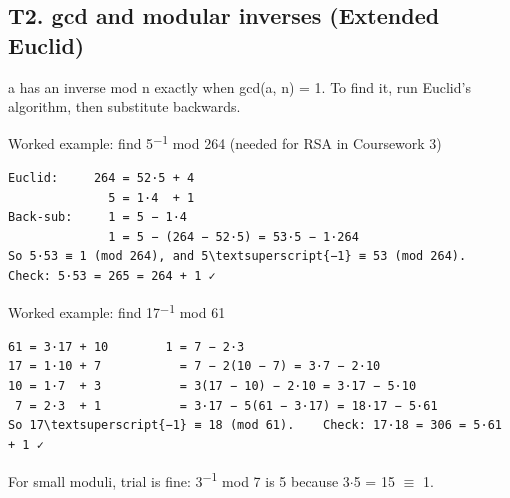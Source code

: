 \documentclass[11pt,a4paper]{article}
\begin{document}
\subsection*{T2. gcd and modular inverses (Extended Euclid)}
a has an inverse mod n exactly when gcd(a, n) = 1. To find it, run Euclid's algorithm, then substitute backwards.\par
\begin{example}{Worked example: find 5\textsuperscript{\ensuremath{-}1} mod 264 (needed for RSA in Coursework 3)}
\begin{workbox}
\begin{Verbatim}[commandchars=\\\{\},fontsize=\footnotesize]
Euclid:     264 = 52·5 + 4
              5 = 1·4  + 1
Back-sub:     1 = 5 − 1·4
              1 = 5 − (264 − 52·5) = 53·5 − 1·264
So 5·53 ≡ 1 (mod 264), and 5\textsuperscript{−1} ≡ 53 (mod 264).    Check: 5·53 = 265 = 264 + 1 ✓
\end{Verbatim}
\end{workbox}
\end{example}
\begin{example}{Worked example: find 17\textsuperscript{\ensuremath{-}1} mod 61}
\begin{workbox}
\begin{Verbatim}[commandchars=\\\{\},fontsize=\footnotesize]
61 = 3·17 + 10        1 = 7 − 2·3
17 = 1·10 + 7           = 7 − 2(10 − 7) = 3·7 − 2·10
10 = 1·7  + 3           = 3(17 − 10) − 2·10 = 3·17 − 5·10
 7 = 2·3  + 1           = 3·17 − 5(61 − 3·17) = 18·17 − 5·61
So 17\textsuperscript{−1} ≡ 18 (mod 61).    Check: 17·18 = 306 = 5·61 + 1 ✓
\end{Verbatim}
\end{workbox}
\end{example}
For small moduli, trial is fine: 3\textsuperscript{\ensuremath{-}1} mod 7 is 5 because 3\ensuremath{\cdot}5 = 15 \ensuremath{\equiv} 1.\par
\end{document}
